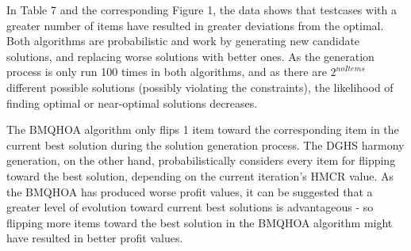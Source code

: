 \documentclass[titlepage]{article}
\begin{document}
In Table 7 and the corresponding Figure 1, the data shows that testcases with a greater number of items have resulted in greater deviations from the optimal. Both algorithms are probabilistic and work by generating new candidate solutions, and replacing worse solutions with better ones. As the generation process is only run 100 times in both algorithms, and as there are $2^{noItems}$ different possible solutions (possibly violating the constraints), the likelihood of finding optimal or near-optimal solutions decreases.

The BMQHOA algorithm only flips 1 item toward the corresponding item in the current best solution during the solution generation process. The DGHS harmony generation, on the other hand, probabilistically considers every item for flipping toward the best solution, depending on the current iteration's HMCR value.  As the BMQHOA has produced worse profit values, it can be suggested that a greater level of evolution toward current best solutions is advantageous - so flipping more items toward the best solution in the BMQHOA algorithm might have resulted in better profit values. 

\newpage



\end{document}
